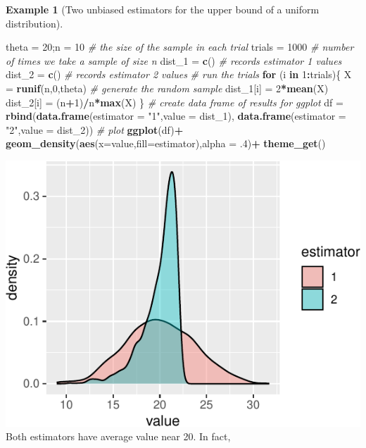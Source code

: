 \documentclass[
]{book}
\newenvironment{Shaded}{\begin{snugshade}}{\end{snugshade}}
\newcommand{\AttributeTok}[1]{\textcolor[rgb]{0.13,0.29,0.53}{#1}}
\newcommand{\CommentTok}[1]{\textcolor[rgb]{0.56,0.35,0.01}{\textit{#1}}}
\newcommand{\ControlFlowTok}[1]{\textcolor[rgb]{0.13,0.29,0.53}{\textbf{#1}}}
\newcommand{\DecValTok}[1]{\textcolor[rgb]{0.00,0.00,0.81}{#1}}
\newcommand{\FunctionTok}[1]{\textcolor[rgb]{0.13,0.29,0.53}{\textbf{#1}}}
\newcommand{\NormalTok}[1]{#1}
\newcommand{\OtherTok}[1]{\textcolor[rgb]{0.56,0.35,0.01}{#1}}
\newcommand{\SpecialCharTok}[1]{\textcolor[rgb]{0.81,0.36,0.00}{\textbf{#1}}}
\newcommand{\StringTok}[1]{\textcolor[rgb]{0.31,0.60,0.02}{#1}}
\theoremstyle{definition}
\theoremstyle{definition}
\newtheorem{example}{Example}[chapter]
\theoremstyle{definition}
\theoremstyle{definition}
\theoremstyle{remark}
\begin{document}
\begin{example}[Two unbiased estimators for the upper bound of a uniform distribution]
\begin{Shaded}
\begin{Highlighting}[]
\NormalTok{theta }\OtherTok{=} \DecValTok{20}\NormalTok{;n }\OtherTok{=} \DecValTok{10} \CommentTok{\# the size of the sample in each trial}
\NormalTok{trials }\OtherTok{=} \DecValTok{1000} \CommentTok{\# number of times we take a sample of size n}
\NormalTok{dist\_1 }\OtherTok{=} \FunctionTok{c}\NormalTok{() }\CommentTok{\# records estimator 1 values}
\NormalTok{dist\_2 }\OtherTok{=} \FunctionTok{c}\NormalTok{() }\CommentTok{\# records estimator 2 values}
\CommentTok{\# run the trials}
\ControlFlowTok{for}\NormalTok{ (i }\ControlFlowTok{in} \DecValTok{1}\SpecialCharTok{:}\NormalTok{trials)\{}
\NormalTok{  X }\OtherTok{=} \FunctionTok{runif}\NormalTok{(n,}\DecValTok{0}\NormalTok{,theta) }\CommentTok{\# generate the random sample}
\NormalTok{  dist\_1[i] }\OtherTok{=} \DecValTok{2}\SpecialCharTok{*}\FunctionTok{mean}\NormalTok{(X)}
\NormalTok{  dist\_2[i] }\OtherTok{=}\NormalTok{ (n}\SpecialCharTok{+}\DecValTok{1}\NormalTok{)}\SpecialCharTok{/}\NormalTok{n}\SpecialCharTok{*}\FunctionTok{max}\NormalTok{(X)}
\NormalTok{\}}
\CommentTok{\# create data frame of results for ggplot}
\NormalTok{df }\OtherTok{=} \FunctionTok{rbind}\NormalTok{(}\FunctionTok{data.frame}\NormalTok{(}\AttributeTok{estimator =} \StringTok{"1"}\NormalTok{,}\AttributeTok{value =}\NormalTok{ dist\_1),}
           \FunctionTok{data.frame}\NormalTok{(}\AttributeTok{estimator =} \StringTok{"2"}\NormalTok{,}\AttributeTok{value =}\NormalTok{ dist\_2))}
\CommentTok{\# plot}
\FunctionTok{ggplot}\NormalTok{(df)}\SpecialCharTok{+}
  \FunctionTok{geom\_density}\NormalTok{(}\FunctionTok{aes}\NormalTok{(}\AttributeTok{x=}\NormalTok{value,}\AttributeTok{fill=}\NormalTok{estimator),}\AttributeTok{alpha =}\NormalTok{ .}\DecValTok{4}\NormalTok{)}\SpecialCharTok{+}
  \FunctionTok{theme\_get}\NormalTok{()}
\end{Highlighting}
\end{Shaded}

\includegraphics{math340-notes_files/figure-latex/unnamed-chunk-38-1.pdf}
Both estimators have average value near 20. In fact,


\end{example}
\end{document}
